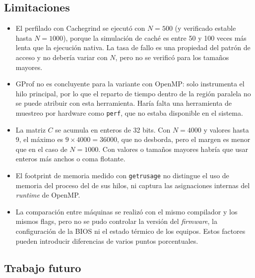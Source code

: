 \subsection{Limitaciones}

\begin{itemize}
    \item El perfilado con Cachegrind se ejecutó con $N=500$ (y verificado estable hasta $N=1000$), porque la simulación de caché es entre 50 y 100 veces más lenta que la ejecución nativa. La tasa de fallo es una propiedad del patrón de acceso y no debería variar con $N$, pero no se verificó para los tamaños mayores.
    \item GProf no es concluyente para la variante con OpenMP: solo instrumenta el hilo principal, por lo que el reparto de tiempo dentro de la región paralela no se puede atribuir con esta herramienta. Haría falta una herramienta de muestreo por hardware como \texttt{perf}, que no estaba disponible en el sistema.
    \item La matriz $C$ se acumula en enteros de 32 bits. Con $N=4000$ y valores hasta 9, el máximo es $9 \times 4000 = 36000$, que no desborda, pero el margen es menor que en el caso de $N=1000$. Con valores o tamaños mayores habría que usar enteros más anchos o coma flotante.
    \item El footprint de memoria medido con \texttt{getrusage} no distingue el uso de memoria del proceso del de sus hilos, ni captura las asignaciones internas del \textit{runtime} de OpenMP.
    \item La comparación entre máquinas se realizó con el mismo compilador y los mismos flags, pero no se pudo controlar la versión del \textit{firmware}, la configuración de la BIOS ni el estado térmico de los equipos. Estos factores pueden introducir diferencias de varios puntos porcentuales.
\end{itemize}

\subsection{Trabajo futuro}

